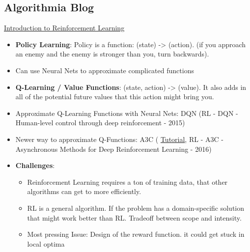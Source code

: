 \subsection{Algorithmia Blog}
\href{https://algorithmia.com/blog/introduction-to-reinforcement-learning}{Introduction to Reinforcement Learning}
\begin{itemize}[noitemsep,nolistsep]
	\item \textbf{Policy Learning}: Policy is a function: (state) -> (action). (if you approach an enemy and the enemy is stronger than you, turn backwards).
	\item Can use Neural Nets to approximate complicated functions
	\item \textbf{Q-Learning / Value Functions}: (state, action) -> (value). It also adds in all of the potential future values that this action might bring you.
	\item Approximate Q-Learning Functions with Neural Nets: DQN (RL - DQN - Human-level control through deep reinforcement - 2015)
	\item Newer way to approximate Q-Functions: A3C ( \href{https://medium.com/emergent-future/simple-reinforcement-learning-with-tensorflow-part-8-asynchronous-actor-critic-agents-a3c-c88f72a5e9f2}{Tutorial}, RL - A3C - Asynchronous Methods for Deep Reinforcement Learning - 2016)
	\item \textbf{Challenges}:
	\begin{itemize}[noitemsep,nolistsep]
		\item Reinforcement Learning requires a ton of training data, that other algorithms can get to more efficiently.
		\item RL is a general algorithm. If the problem has a domain-specific solution that might work better than RL. Tradeoff between scope and intensity.
		\item Most pressing Issue: Design of the reward function. it could get stuck in local optima
	\end{itemize} 
\end{itemize}
